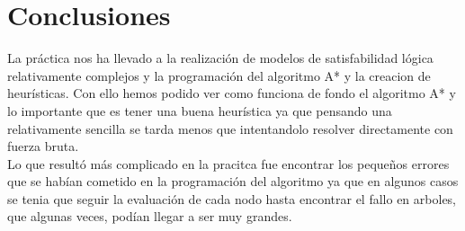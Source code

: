 \documentclass[11pt,spanish]{article}
\begin{document}
	\section{Conclusiones}
		La práctica nos ha llevado a la realización de modelos de satisfabilidad lógica relativamente complejos y la programación del algoritmo A* y la creacion de heurísticas. Con ello hemos podido ver como funciona de fondo el algoritmo A* y lo importante que es tener una buena heurística ya que pensando una relativamente sencilla se tarda menos que intentandolo resolver directamente con fuerza bruta.\\
		Lo que resultó más complicado en la pracitca fue encontrar los pequeños errores que se habían cometido en la programación del algoritmo ya que en algunos casos se tenia que seguir la evaluación de cada nodo hasta encontrar el fallo en arboles, que algunas veces, podían llegar a ser muy grandes.

\end{document}
